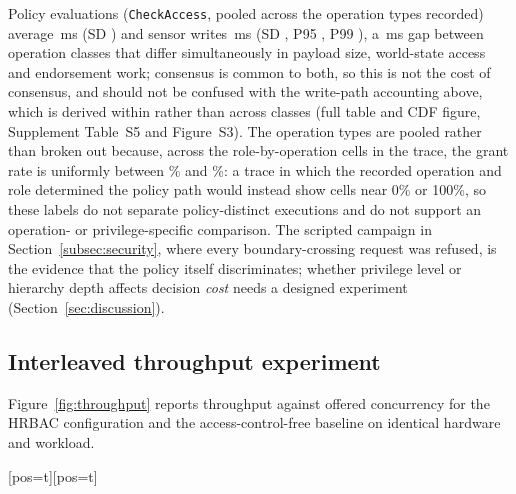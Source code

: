 \documentclass[a4paper,fleqn]{cas-sc}
\makeatletter
\newenvironment{widefig}[1][pos=t]
  {\ifdoublecol \@nameuse{figure*}[#1]\else \@nameuse{figure}[#1]\fi}
  {\ifdoublecol \@nameuse{endfigure*}\else \@nameuse{endfigure}\fi}
\makeatother
\begin{document}
Policy evaluations (\texttt{CheckAccess}, pooled across the \DecisionOps{}
operation types recorded) average \DecisionMean\,ms (SD \DecisionSD) and
sensor writes \WriteMean\,ms (SD \WriteSD, P95 \WritePNinetyFive, P99
\WritePNinetyNine), a \CommitCost\,ms gap between operation classes that
differ simultaneously in payload size, world-state access and endorsement
work; consensus is common to both, so this is not the cost of consensus,
and should not be confused with the write-path accounting above, which is
derived within rather than across classes (full table and CDF figure,
Supplement Table~S5 and Figure~S3). The \DecisionOps{} operation types are
pooled rather than broken out because, across the \PolicyCells{}
role-by-operation cells in the trace, the grant rate is uniformly between
\PolicyGrantMin\% and \PolicyGrantMax\%: a trace in which the recorded
operation and role determined the policy path would instead show cells
near 0\% or 100\%, so these labels do not separate policy-distinct
executions and do not support an operation- or privilege-specific
comparison. The scripted campaign in Section~\ref{subsec:security}, where
every boundary-crossing request was refused, is the evidence that the
policy itself discriminates; whether privilege level or hierarchy depth
affects decision \emph{cost} needs a designed experiment
(Section~\ref{sec:discussion}).

\subsection{Interleaved throughput experiment}
\label{subsec:throughput}

Figure~\ref{fig:throughput} reports throughput against offered concurrency
for the HRBAC configuration and the access-control-free baseline on
identical hardware and workload.

\begin{widefig}
\centering
{}
\caption{Mean throughput and standard deviation across five interleaved runs per concurrency level.}
\label{fig:throughput}
\end{widefig}
\end{document}

